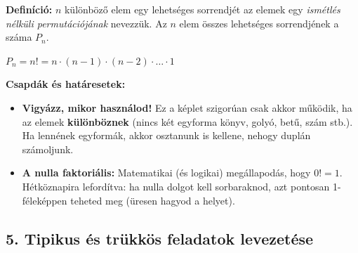 \documentclass[11pt, a4paper]{article}
\begin{document}
\textbf{Definíció:} $n$ különböző elem egy lehetséges sorrendjét az elemek egy \emph{ismétlés nélküli permutációjának} nevezzük. Az $n$ elem összes lehetséges sorrendjének a száma $P_n$.

$P_n = n! = n \cdot (n - 1) \cdot (n - 2) \cdot \dots \cdot 1$

\vspace{0.2cm}
\noindent\textbf{Csapdák és határesetek:}
\begin{itemize}
    \item \textbf{Vigyázz, mikor használod!} Ez a képlet szigorúan csak akkor működik, ha az elemek \textbf{különböznek} (nincs két egyforma könyv, golyó, betű, szám stb.). Ha lennének egyformák, akkor osztanunk is kellene, nehogy duplán számoljunk.
    \item \textbf{A nulla faktoriális:} Matematikai (és logikai) megállapodás, hogy $0! = 1$. Hétköznapira lefordítva: ha nulla dolgot kell sorbaraknod, azt pontosan 1-féleképpen teheted meg (üresen hagyod a helyet).
\end{itemize}

\vspace{0.5cm}
\noindent{}
\vspace{0.5cm}

\subsection*{5. Tipikus és trükkös feladatok levezetése}
\end{document}
